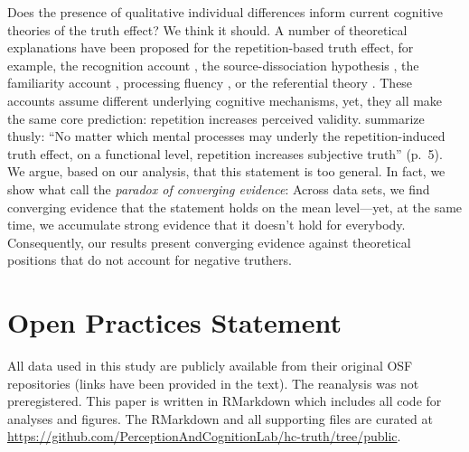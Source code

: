 \documentclass[
  english,
  ,man,floatsintext]{apa6}
\begin{document}
Does the presence of qualitative individual differences inform current cognitive theories of the truth effect? We think it should. A number of theoretical explanations have been proposed for the repetition-based truth effect, for example, the recognition account \autocite{bacon1979}, the source-dissociation hypothesis \autocite{arkes1991}, the familiarity account \autocite{begg1992}, processing fluency \autocite{reber1999}, or the referential theory \autocite{unkelbach2017}. These accounts assume different underlying cognitive mechanisms, yet, they all make the same core prediction: repetition increases perceived validity. \textcite{unkelbach2019} summarize thusly: ``No matter which mental processes may underly the repetition-induced truth effect, on a functional level, repetition increases subjective truth'' (p.~5). We argue, based on our analysis, that this statement is too general. In fact, we show what \textcite{davis-stober2019} call the \emph{paradox of converging evidence}: Across data sets, we find converging evidence that the statement holds on the mean level---yet, at the same time, we accumulate strong evidence that it doesn't hold for everybody. Consequently, our results present converging evidence against theoretical positions that do not account for negative truthers.

\section{Open Practices Statement}

All data used in this study are publicly available from their original OSF repositories (links have been provided in the text). The reanalysis was not preregistered. This paper is written in RMarkdown which includes all code for analyses and figures. The RMarkdown and all supporting files are curated at \url{https://github.com/PerceptionAndCognitionLab/hc-truth/tree/public}.

\printbibliography

\clearpage
\makeatletter
\efloat@restorefloats
\makeatother
\end{document}
